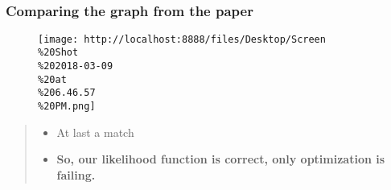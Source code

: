 \documentclass[11pt]{article}
\makeatletter
\def\maxwidth{\ifdim\Gin@nat@width>\linewidth\linewidth
    \else\Gin@nat@width\fi}
\let\Oldincludegraphics\includegraphics
\renewcommand{\includegraphics}[1]{\Oldincludegraphics[width=.8\maxwidth]{#1}}
\providecommand{\tightlist}{%
      \setlength{\itemsep}{0pt}\setlength{\parskip}{0pt}}
\makeatother
\begin{document}
    \begin{center}
    \end{center}
    { \hspace*{\fill} \\}
    
    \subsubsection{Comparing the graph from the
paper}\label{comparing-the-graph-from-the-paper}

\begin{figure}
\centering
\texttt{[image: http://localhost:8888/files/Desktop/Screen\\\%20Shot\\\%202018-03-09\\\%20at\\\%206.46.57\\\%20PM.png]}
\caption{}
\end{figure}

    \begin{quote}
\begin{itemize}
\tightlist
\item
  At last a match
\item
  \textbf{So, our likelihood function is correct, only optimization is
  failing.}
\end{itemize}
\end{quote}


    
    
    
    
\end{document}
